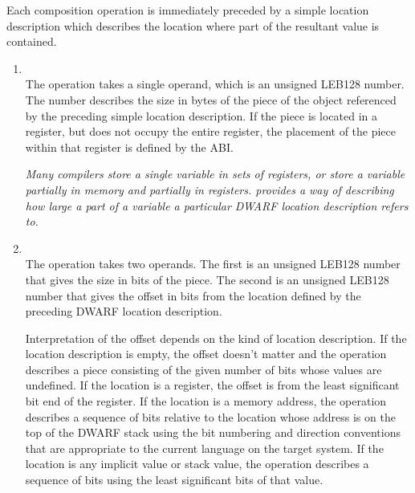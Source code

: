 Each composition operation is immediately preceded by a simple
location description which describes the location where part
of the resultant value is contained.

\begin{enumerate}[1]
\item {} \\
The  operation takes a single operand, which is an
unsigned LEB128 number.  The number describes the size in bytes
of the piece of the object referenced by the preceding simple
location description. If the piece is located in a register,
but does not occupy the entire register, the placement of
the piece within that register is defined by the ABI.

\textit{Many compilers store a single variable in sets of registers,
or store a variable partially in memory and partially in
registers.  provides a way of describing how large
a part of a variable a particular DWARF location description
refers to. }

\item {} \\
The  operation takes two operands. The first
is an unsigned LEB128 number that gives the size in bits
of the piece. The second is an unsigned LEB128 number that
gives the offset in bits from the location defined by the
preceding DWARF location description.  

Interpretation of the
offset depends on the kind of location description. If the
location description is empty, the offset doesn’t matter and
the  operation describes a piece consisting
of the given number of bits whose values are undefined. If
the location is a register, the offset is from the least
significant bit end of the register. If the location is a
memory address, the  operation describes a
sequence of bits relative to the location whose address is
on the top of the DWARF stack using the bit numbering and
direction conventions that are appropriate to the current
language on the target system. If the location is any implicit
value or stack value, the  operation describes
a sequence of bits using the least significant bits of that
value.  
\end{enumerate}


